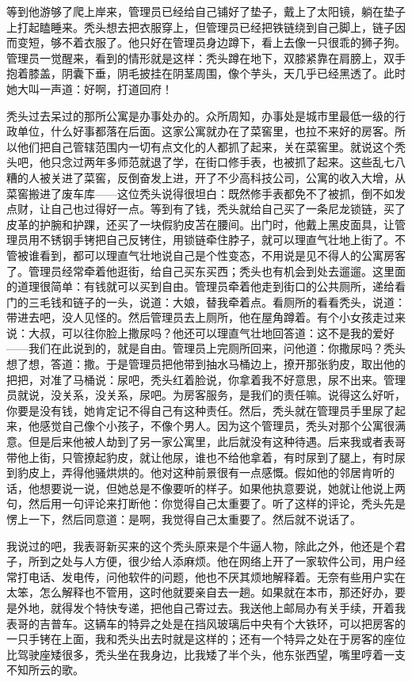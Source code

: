 等到他游够了爬上岸来，管理员已经给自己铺好了垫子，戴上了太阳镜，躺在垫子上打起瞌睡来。秃头想去把衣服穿上，但管理员已经把铁链绕到自己脚上，链子因而变短，够不着衣服了。他只好在管理员身边蹲下，看上去像一只很乖的狮子狗。管理员一觉醒来，看到的情形就是这样：秃头蹲在地下，双膝紧靠在肩膀上，双手抱着膝盖，阴囊下垂，阴毛披挂在阴茎周围，像个芋头，天几乎已经黑透了。此时她大叫一声道：好啊，打道回府！ 

秃头过去呆过的那所公寓是办事处办的。众所周知，办事处是城市里最低一级的行政单位，什么好事都落在后面。这家公寓就办在了菜窖里，也拉不来好的房客。所以他们把自己管辖范围内一切有点文化的人都抓了起来，关在菜窖里。就说这个秃头吧，他只念过两年多师范就退了学，在街口修手表，也被抓了起来。这些乱七八糟的人被关进了菜窖，反倒奋发上进，开了不少高科技公司，公寓的收入大增，从菜窖搬进了废车库——这位秃头说得很坦白：既然修手表都免不了被抓，倒不如发点财，让自己也过得好一点。等到有了钱，秃头就给自己买了一条尼龙锁链，买了皮革的护腕和护踝，还买了一块假豹皮苫在腰间。出门时，他戴上黑皮面具，让管理员用不锈钢手铐把自己反铐住，用锁链牵住脖子，就可以理直气壮地上街了。不管被谁看到，都可以理直气壮地说自己是个性变态，不用说是见不得人的公寓房客了。管理员经常牵着他逛街，给自己买东买西；秃头也有机会到处去遛遛。这里面的道理很简单：有钱就可以买到自由。管理员牵着他走到街口的公共厕所，递给看门的三毛钱和链子的一头，说道：大娘，替我牵着点。看厕所的看看秃头，说道：带进去吧，没人见怪的。然后管理员去上厕所，他在屋角蹲着。有个小女孩走过来说：大叔，可以往你脸上撒尿吗？他还可以理直气壮地回答道：这不是我的爱好——我们在此说到的，就是自由。管理员上完厕所回来，问他道：你撒尿吗？秃头想了想，答道：撒。于是管理员把他带到抽水马桶边上，撩开那张豹皮，取出他的把把，对准了马桶说：尿吧，秃头红着脸说，你拿着我不好意思，尿不出来。管理员就说，没关系，没关系，尿吧。为房客服务，是我们的责任嘛。说得这么好听，你要是没有钱，她肯定记不得自己有这种责任。然后，秃头就在管理员手里尿了起来，他感觉自己像个小孩子，不像个男人。因为这个管理员，秃头对那个公寓很满意。但是后来他被人劫到了另一家公寓里，此后就没有这种待遇。后来我或者表哥带他上街，只管撩起豹皮，就让他尿，谁也不给他拿着，有时尿到了腿上，有时尿到豹皮上，弄得他骚烘烘的。他对这种前景很有一点感慨。假如他的邻居肯听的话，他想要说一说，但她总是不像要听的样子。如果他执意要说，她就让他说上两句，然后用一句评论来打断他：你觉得自己太重要了。听了这样的评论，秃头先是愣上一下，然后同意道：是啊，我觉得自己太重要了。然后就不说话了。 



我说过的吧，我表哥新买来的这个秃头原来是个牛逼人物，除此之外，他还是个君子，所到之处与人方便，很少给人添麻烦。他在网络上开了一家软件公司，用户经常打电话、发电传，问他软件的问题，他也不厌其烦地解释着。无奈有些用户实在太笨，怎么解释也不管用，这时他就要亲自去一趟。如果就在本市，那还好办，要是外地，就得发个特快专递，把他自己寄过去。我送他上邮局办有关手续，开着我表哥的吉普车。这辆车的特异之处是在挡风玻璃后中央有个大铁环，可以把房客的一只手铐在上面，我和秃头出去时就是这样的；还有一个特异之处在于房客的座位比驾驶座矮很多，秃头坐在我身边，比我矮了半个头，他东张西望，嘴里哼着一支不知所云的歌。 

